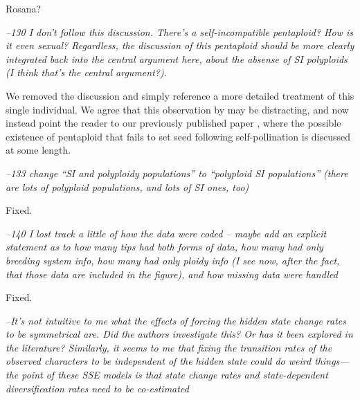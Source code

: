 \documentclass[11pt]{article}
\renewenvironment{quote}{\bigskip\noindent\itshape\ignorespaces}{\smallskip}
\begin{document}
Rosana? %

\begin{quote}
--130 I don't follow this discussion.
There's a self-incompatible pentaploid?
How is it even sexual?
Regardless, the discussion of this pentaploid should be more clearly integrated back into the central argument here, about the absense of SI polyploids (I think that's the central argument?).
\end{quote}

We removed the discussion and simply reference a more detailed treatment of this single individual.
We agree that this observation by \citet{camadro_1981} may be distracting, and now instead  point the reader to our previously published paper \citep{robertson_2011}, where the possible existence of pentaploid that fails to set seed following self-pollination is discussed at some length.


\begin{quote}
--133 change ``SI and polyploidy populations'' to ``polyploid SI populations'' (there are lots of polyploid populations, and lots of SI ones, too)
\end{quote}

Fixed.

\begin{quote}
--140 I lost track a little of how the data were coded -- maybe add an explicit statement as to how many tips had both forms of data, how many had only breeding system info, how many had only ploidy info (I see now, after the fact, that those data are included in the figure), and how missing data were handled
\end{quote}

Fixed.

\begin{quote}
--It's not intuitive to me what the effects of forcing the hidden state change rates to be symmetrical are.
Did the authors investigate this?
Or has it been explored in the literature?
Similarly, it seems to me that fixing the transition rates of the observed characters to be independent of the hidden state could do weird things---the point of these SSE models is that state change rates and state-dependent diversification rates need to be co-estimated
\end{quote}
\end{document}
